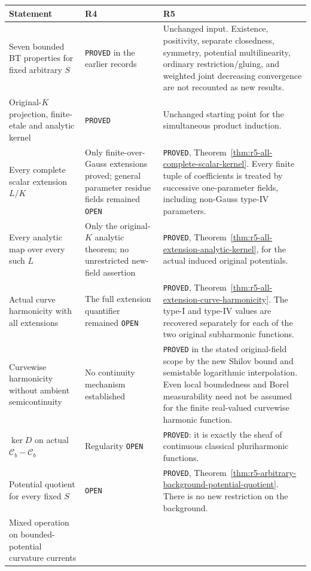 \documentclass[11pt,a4paper]{article}
\numberwithin{equation}{section}
\theoremstyle{definition}
\theoremstyle{remark}
\begin{document}
\begingroup
\setlength{\tabcolsep}{3pt}
\begin{longtable}{@{}p{}p{}p{}@{}}
\toprule
Statement & R4 & R5\\
\midrule
\endhead
Seven bounded BT properties for fixed arbitrary $S$ &
\texttt{PROVED} in the earlier records &
Unchanged input. Existence, positivity, separate closedness,
symmetry, potential multilinearity, ordinary restriction/gluing,
and weighted joint decreasing convergence are not recounted as
new results.\\[4pt]
Original-$K$ projection, finite-etale and analytic kernel &
\texttt{PROVED} &
Unchanged starting point for the simultaneous product induction.\\[4pt]
Every complete scalar extension $L/K$ &
Only finite-over-Gauss extensions proved; general parameter
residue fields remained \texttt{OPEN} &
\texttt{PROVED}, Theorem~\ref{thm:r5-all-complete-scalar-kernel}.
Every finite tuple of coefficients is treated by successive
one-parameter fields, including non-Gauss type-IV parameters.\\[4pt]
Every analytic map over every such $L$ &
Only the original-$K$ analytic theorem; no unrestricted
new-field assertion &
\texttt{PROVED}, Theorem~\ref{thm:r5-all-extension-analytic-kernel},
for the actual induced original potentials.\\[4pt]
Actual curve harmonicity with all extensions &
The full extension quantifier remained \texttt{OPEN} &
\texttt{PROVED}, Theorem~\ref{thm:r5-all-extension-curve-harmonicity}.
The type-I and type-IV values are recovered separately for
each of the two original subharmonic functions.\\[4pt]
Curvewise harmonicity without ambient semicontinuity &
No continuity mechanism established &
\texttt{PROVED} in the stated original-field scope by the new
Shilov bound and semistable logarithmic interpolation.
Even local boundedness and Borel measurability need not be
assumed for the finite real-valued curvewise harmonic function.\\[4pt]
$\ker D$ on actual $\mathcal C_b-\mathcal C_b$ &
Regularity \texttt{OPEN} &
\texttt{PROVED}: it is exactly the sheaf of continuous
classical pluriharmonic functions.\\[4pt]
Potential quotient for every fixed $S$ &
\texttt{OPEN} &
\texttt{PROVED}, Theorem~\ref{thm:r5-arbitrary-background-potential-quotient}.
There is no new restriction on the background.\\[4pt]
Mixed operation on bounded-potential curvature currents &

\end{longtable}
\end{document}
